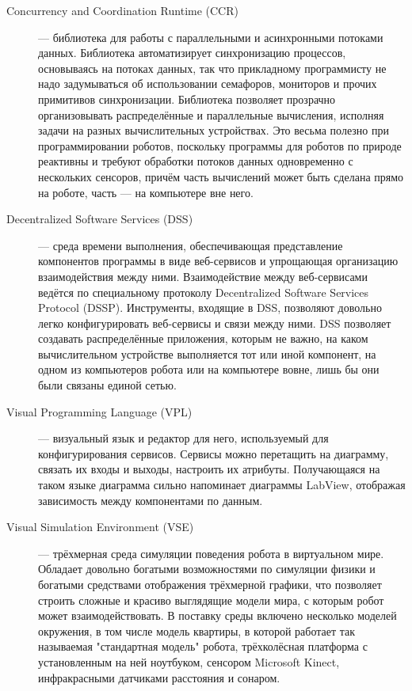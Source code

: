 \documentclass[a4paper]{article}
\begin{document}
\begin{description}
  \item[Concurrency and Coordination Runtime (CCR)] --- библиотека для работы с параллельными и асинхронными потоками данных. Библиотека автоматизирует синхронизацию процессов, основываясь на потоках данных, так что прикладному программисту не надо задумываться об использовании семафоров, мониторов и прочих примитивов синхронизации. Библиотека позволяет прозрачно организовывать распределённые и параллельные вычисления, исполняя задачи на разных вычислительных устройствах. Это весьма полезно при программировании роботов, поскольку программы для роботов по природе реактивны и требуют обработки потоков данных одновременно с нескольких сенсоров, причём часть вычислений может быть сделана прямо на роботе, часть --- на компьютере вне него.
  \item[Decentralized Software Services (DSS)] --- среда времени выполнения, обеспечивающая представление компонентов программы в виде веб-сервисов и упрощающая организацию взаимодействия между ними. Взаимодействие между веб-сервисами ведётся по специальному протоколу Decentralized Software Services Protocol (DSSP). Инструменты, входящие в DSS, позволяют довольно легко конфигурировать веб-сервисы и связи между ними. DSS позволяет создавать распределённые приложения, которым не важно, на каком вычислительном устройстве выполняется тот или иной компонент, на одном из компьютеров робота или на компьютере вовне, лишь бы они были связаны единой сетью.
  \item[Visual Programming Language (VPL)] --- визуальный язык и редактор для него, используемый для конфигурирования сервисов. Сервисы можно перетащить на диаграмму, связать их входы и выходы, настроить их атрибуты. Получающаяся на таком языке диаграмма сильно напоминает диаграммы LabView, отображая зависимость между компонентами по данным.
  \item[Visual Simulation Environment (VSE)] --- трёхмерная среда симуляции поведения робота в виртуальном мире. Обладает довольно богатыми возможностями по симуляции физики и богатыми средствами отображения трёхмерной графики, что позволяет строить сложные и красиво выглядящие модели мира, с которым робот может взаимодействовать. В поставку среды включено несколько моделей окружения, в том числе модель квартиры, в которой работает так называемая "стандартная модель" робота, трёхколёсная платформа с установленным на ней ноутбуком, сенсором Microsoft Kinect\textregistered, инфракрасными датчиками расстояния и сонаром.
\end{description}
\end{document}
